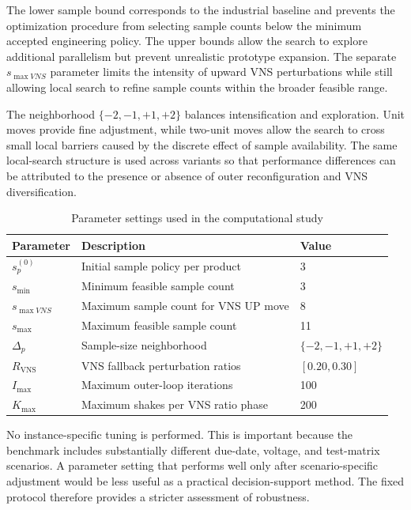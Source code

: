 \documentclass[11pt]{article}
\begin{document}
The lower sample bound corresponds to the industrial baseline and prevents the optimization procedure from selecting sample counts below the minimum accepted engineering policy. The upper bounds allow the search to explore additional parallelism but prevent unrealistic prototype expansion. The separate \(s_{\max VNS}\) parameter limits the intensity of upward VNS perturbations while still allowing local search to refine sample counts within the broader feasible range.

The neighborhood \(\{-2,-1,+1,+2\}\) balances intensification and exploration. Unit moves provide fine adjustment, while two-unit moves allow the search to cross small local barriers caused by the discrete effect of sample availability. The same local-search structure is used across variants so that performance differences can be attributed to the presence or absence of outer reconfiguration and VNS diversification.

\begin{table}[H]
\centering
\caption{Parameter settings used in the computational study}
\label{tab:param_settings_short}
\small
\begin{tabular}{lll}
\hline
\textbf{Parameter} & \textbf{Description} & \textbf{Value} \\
\hline
\(s_p^{(0)}\) & Initial sample policy per product & 3 \\
\(s_{\min}\) & Minimum feasible sample count & 3 \\
\(s_{\max VNS}\) & Maximum sample count for VNS UP move & 8 \\
\(s_{\max}\) & Maximum feasible sample count & 11 \\
\(\Delta_p\) & Sample-size neighborhood & \(\{-2,-1,+1,+2\}\) \\
\(R_{\mathrm{VNS}}\) & VNS fallback perturbation ratios & \([0.20,0.30]\) \\
\(I_{\max}\) & Maximum outer-loop iterations & 100 \\
\(K_{\max}\) & Maximum shakes per VNS ratio phase & 200 \\
\hline
\end{tabular}
\end{table}

No instance-specific tuning is performed. This is important because the benchmark includes substantially different due-date, voltage, and test-matrix scenarios. A parameter setting that performs well only after scenario-specific adjustment would be less useful as a practical decision-support method. The fixed protocol therefore provides a stricter assessment of robustness.
\end{document}
